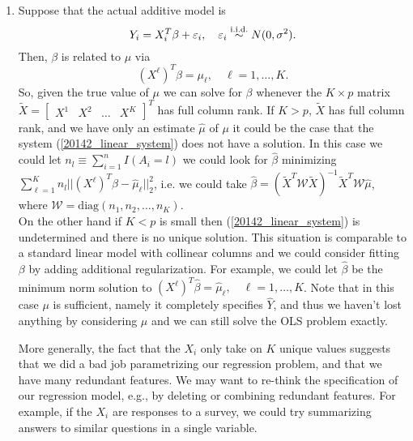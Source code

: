 \begin{enumerate}
\item Suppose that the actual additive model is
	\begin{equation*}
	Y_i = X_i^T \beta + {\varepsilon}_i, \quad {\varepsilon}_i \overset{\text{i.i.d.}}{\sim} N(0, \sigma^2).
	\end{equation*}
	Then, $\beta$ is related to $\mu$ via
	\begin{equation}\label{20142_linear_system}
	(X^\ell)^T \beta = \mu_\ell, \quad \ell = 1, \dots, K.
	\end{equation}
	So, given the true value of $\mu$ we can solve for $\beta$ whenever the $K \times p$ matrix $\tilde{X}  = \begin{bmatrix} X^1 & X^2 & \dots & X^K \end{bmatrix}^T$ has full column rank. If $K>p$, $\tilde{X}$ has full column rank, and we have only an estimate $\hat{\mu}$ of $\mu$ it could be the case that the system (\ref{20142_linear_system}) does not have a solution. In this case we could let $n_l \equiv \sum_{i=1}^n I(A_i=l)$  we could look for $\hat{\beta}$ minimizing $\sum_{\ell =1}^K n_l ||(X^\ell)^T \beta - \hat{\mu}_\ell||^2_2$, i.e. we could take $\hat{\beta} = (\tilde{X}^T \mathcal{W} \tilde{X} )^{-1} \tilde{X}^T \mathcal{W} \hat{\mu}$, where $\mathcal{W}=\text{diag}(n_1,n_2,\dots, n_K)$.\\ 
	
	
On the other hand if $K<p$ is small then (\ref{20142_linear_system}) is undetermined and there is no unique solution. This situation is comparable to a standard linear model with collinear columns and we could consider fitting $\beta$ by adding additional regularization. For example, we could let $\hat{\beta}$ be the minimum norm solution to $ (X^\ell)^T \hat{\beta} = \hat{\mu}_\ell, \quad \ell = 1, \dots, K$. Note that in this case $\mu$ is sufficient, namely it completely specifies $\hat{Y}$, and thus we haven't lost anything by considering $\mu$ and we can still solve the OLS problem exactly.

More generally, the fact that the $X_i$ only take on $K$ unique values suggests that we did a bad job parametrizing our regression problem, and that we have many redundant features. We may want to re-think the specification of our regression model, e.g., by deleting or combining redundant features. For example, if the $X_i$ are responses to a survey, we could try summarizing answers to similar questions in a single variable.

\end{enumerate}


